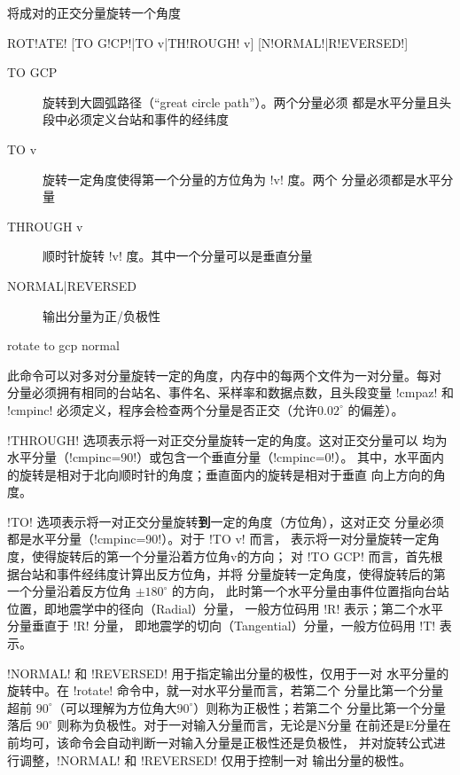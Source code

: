 \label{cmd:rotate}

将成对的正交分量旋转一个角度

\begin{SACSTX}
ROT!ATE! [TO G!CP!|TO v|TH!ROUGH! v] [N!ORMAL!|R!EVERSED!]
\end{SACSTX}

\begin{description}
\item [TO GCP] 旋转到大圆弧路径（``great circle path''）。两个分量必须
    都是水平分量且头段中必须定义台站和事件的经纬度
\item [TO v] 旋转一定角度使得第一个分量的方位角为 !v! 度。两个
    分量必须都是水平分量
\item [THROUGH v] 顺时针旋转 !v! 度。其中一个分量可以是垂直分量
\item [NORMAL|REVERSED] 输出分量为正/负极性
\end{description}

\begin{SACDFT}
rotate to gcp normal
\end{SACDFT}

此命令可以对多对分量旋转一定的角度，内存中的每两个文件为一对分量。每对
分量必须拥有相同的台站名、事件名、采样率和数据点数，且头段变量 !cmpaz!
和 !cmpinc! 必须定义，程序会检查两个分量是否正交（允许$0.02^\circ$ 的偏差）。

!THROUGH! 选项表示将一对正交分量旋转一定的角度。这对正交分量可以
均为水平分量（!cmpinc=90!）或包含一个垂直分量（!cmpinc=0!）。
其中，水平面内的旋转是相对于北向顺时针的角度；垂直面内的旋转是相对于垂直
向上方向的角度。

!TO! 选项表示将一对正交分量旋转\textbf{到}一定的角度（方位角），这对正交
分量必须都是水平分量（!cmpinc=90!）。对于 !TO v! 而言，
表示将一对分量旋转一定角度，使得旋转后的第一个分量沿着方位角v的方向；
对 !TO GCP! 而言，首先根据台站和事件经纬度计算出反方位角，并将
分量旋转一定角度，使得旋转后的第一个分量沿着反方位角 $\pm 180 ^\circ$ 的方向，
此时第一个水平分量由事件位置指向台站位置，即地震学中的径向（Radial）分量，
一般方位码用 !R! 表示；第二个水平分量垂直于 !R! 分量，
即地震学的切向（Tangential）分量，一般方位码用 !T! 表示。

!NORMAL! 和 !REVERSED! 用于指定输出分量的极性，仅用于一对
水平分量的旋转中。在 !rotate! 命令中，就一对水平分量而言，若第二个
分量比第一个分量超前 $90^\circ$（可以理解为方位角大$90^\circ$）则称为正极性；若第二个
分量比第一个分量落后 $90^\circ$ 则称为负极性。对于一对输入分量而言，无论是N分量
在前还是E分量在前均可，该命令会自动判断一对输入分量是正极性还是负极性，
并对旋转公式进行调整，!NORMAL! 和 !REVERSED! 仅用于控制一对
输出分量的极性。

